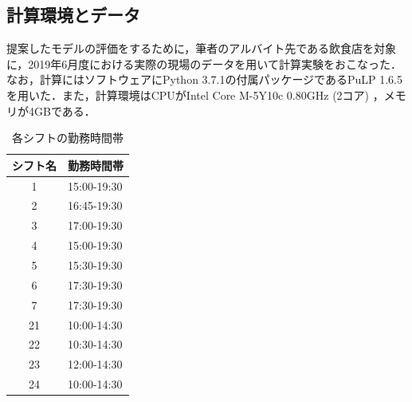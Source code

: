 \documentclass[twocolumn]{jsarticle}
\begin{document}
\subsection{計算環境とデータ}
提案したモデルの評価をするために，筆者のアルバイト先である飲食店を対象に，2019年6月度における実際の現場のデータを用いて計算実験をおこなった．なお，計算にはソフトウェアにPython 3.7.1の付属パッケージであるPuLP 1.6.5 \cite{bib:pulp}を用いた．また，計算環境はCPUがIntel Core M-5Y10c 0.80GHz (2コア) ，メモリが4GBである．
\begin{table}[b]
 \begin{center}
 \caption{各シフトの勤務時間帯}
  \begin{tabular}{cl}
    \hline \hline
    シフト名 & 勤務時間帯 \\ \hline
    1 & 15:00-19:30 \\
    2 & 16:45-19:30 \\
    3 & 17:00-19:30 \\
    4 & 15:00-19:30 \\
    5 & 15:30-19:30 \\
    6 & 17:30-19:30 \\
    7 & 17:30-19:30 \\
    21 & 10:00-14:30 \\
    22 & 10:30-14:30 \\
    23 & 12:00-14:30 \\
    24 & 10:00-14:30 \\ \hline \hline
  \end{tabular}
  \label{tab:shift_time}
 \end{center}
\end{table}
\begin{table}[htb]
  \begin{center}
    \caption{シフト構成と上下限人数}
    \label{tab:shift_construct}
  \end{center}
\end{table}
\end{document}

